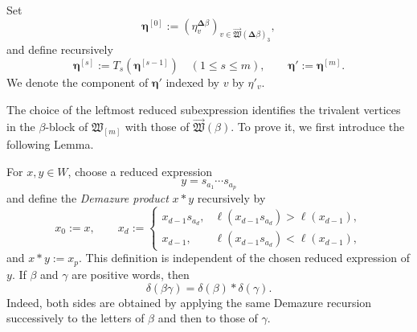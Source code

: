 \documentclass[12pt, reqno]{amsart}
\theoremstyle{plain}
\theoremstyle{definition}
\numberwithin{equation}{section}
\begin{document}
Set
\begin{equation}\label{eq:initial-eta-tuple-Delta-beta}
    \boldsymbol\eta^{[0]}
    :=\left(\eta_v^{\boldsymbol{\Delta}\beta}\right)_
       {v\in\overrightarrow{\mathfrak W}
       (\boldsymbol{\Delta}\beta)_3},
\end{equation}
and define recursively
\begin{equation}\label{eq:successively-mutated-eta-Delta-beta}
    \boldsymbol\eta^{[s]}
    :=T_s(\boldsymbol\eta^{[s-1]})
    \quad(1\leq s\leq m),
    \qquad
    \boldsymbol\eta':=\boldsymbol\eta^{[m]}.
\end{equation}
We denote the component of \(\boldsymbol\eta'\) indexed by \(v\)
by \(\eta'_v\).

The choice of the leftmost reduced subexpression identifies the
trivalent vertices in the \(\beta\)-block of \(\mathfrak W_{[m]}\)
with those of \(\overrightarrow{\mathfrak W}(\beta)\). To prove it, we first introduce the following Lemma.

For \(x,y\in W\), choose a reduced expression
\[
    y=s_{a_1}\cdots s_{a_p}
\]
and define the \emph{Demazure product} \(x*y\) recursively by
\[
    x_0:=x,
    \qquad
    x_d:=
    \begin{cases}
        x_{d-1}s_{a_d},
        &\ell(x_{d-1}s_{a_d})>\ell(x_{d-1}),\\
        x_{d-1},
        &\ell(x_{d-1}s_{a_d})<\ell(x_{d-1}),
    \end{cases}
\]
and \(x*y:=x_p\). This definition is independent of the chosen
reduced expression of \(y\). If \(\beta\) and \(\gamma\) are
positive words, then
\begin{equation}\label{eq:Demazure-product-concatenation}
    \delta(\beta\gamma)
    =
    \delta(\beta)*\delta(\gamma).
\end{equation}
Indeed, both sides are obtained by applying the same Demazure
recursion successively to the letters of \(\beta\) and then to
those of \(\gamma\).
\end{document}
